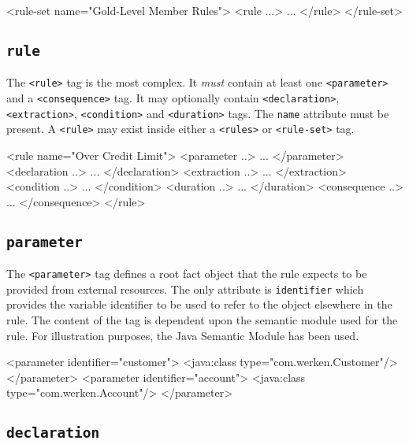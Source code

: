 \begin{codelisting}
<rule-set name="Gold-Level Member Rules">
\textcolor{light}{  <rule ...>
    ...
  </rule>}
</rule-set>
\end{codelisting}

\subsection{\texttt{rule}}

The \verb|<rule>| tag is the most complex.  It \emph{must} contain
at least one \verb|<parameter>| and a \verb|<consequence>| tag.  It
may optionally contain \verb|<declaration>|, \verb|<extraction>|,
\verb|<condition>| and \verb|<duration>| tags.  The \verb|name|
attribute must be present. A \verb|<rule>| may exist inside either 
a \verb|<rules>| or \verb|<rule-set>| tag.

\begin{codelisting}
<rule name="Over Credit Limit">
\textcolor{light}{  <parameter ..>
    ...
  </parameter>
  <declaration ..>
    ...
  </declaration>
  <extraction ..>
    ...
  </extraction>
  <condition ..>
    ...
  </condition>
  <duration ..>
    ...
  </duration>
  <consequence ..>
    ...
  </consequence>}
</rule>
\end{codelisting}

\subsection{\texttt{parameter}}

The \verb|<parameter>| tag defines a root fact object that the
rule expects to be provided from external resources.  The only
attribute is \verb|identifier| which provides the variable identifier
to be used to refer to the object elsewhere in the rule. The content
of the tag is dependent upon the semantic module used for the rule.
For illustration purposes, the Java Semantic Module has been used.

\begin{codelisting}
<parameter identifier="customer">
\textcolor{light}{  <java:class type="com.werken.Customer"/>}
</parameter>
<parameter identifier="account">
\textcolor{light}{  <java:class type="com.werken.Account"/>}
</parameter>
\end{codelisting}

\subsection{\texttt{declaration}}


